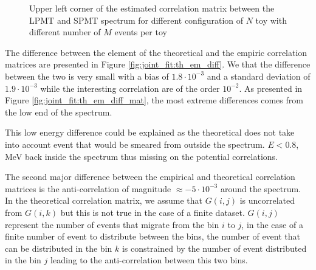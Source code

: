 \documentclass[../main.tex]{subfiles}
\begin{document}
\begin{figure}[ht]
\begin{subfigure}[t]{0.33\linewidth}
    \caption{}
    \label{fig:joint_fit:empirical_cor:cheff_kiss}
  \end{subfigure}
  \caption{Upper left corner of the estimated correlation matrix between the LPMT and SPMT spectrum for different configuration of $N$ toy with different number of $M$ events per toy}
  \label{fig:joint_fit:empirical_cor}
\end{figure}


The difference between the element of the theoretical and the empiric correlation matrices are presented in Figure \ref{fig:joint_fit:th_em_diff}. We that the difference between the two is very small with a bias of $1.8 \cdot 10^{-3}$ and a standard deviation of $1.9 \cdot 10^{-3}$ while the interesting correlation are of the order $10^{-2}$. As presented in Figure \ref{fig:joint_fit:th_em_diff_mat}, the most extreme differences comes from the low end of the spectrum.

This low energy difference could be explained as the theoretical does not take into account event that would be smeared from outside the spectrum. $E < 0.8$, MeV back inside the spectrum thus missing on the potential correlations.

The second major difference between the empirical and theoretical correlation matrices is the anti-correlation of magnitude $\approx -5\cdot 10^{-3}$ around the spectrum. In the theoretical correlation matrix, we assume that $G(i, j)$ is uncorrelated from $G(i, k)$ but this is not true in the case of a finite dataset. $G(i, j)$ represent the number of events that migrate from the bin $i$ to $j$, in the case of a finite number of event to distribute between the bins, the number of event that can be distributed in the bin $k$ is constrained by the number of event distributed in the bin $j$ leading to the anti-correlation between this two bins.
\end{document}
